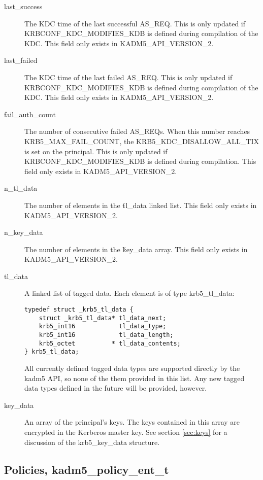 \begin{description}
\item[last_success] The KDC time of the last successful AS_REQ.  This
is only updated if KRBCONF_KDC_MODIFIES_KDB is defined during
compilation of the KDC.  This field only exists in
KADM5_API_VERSION_2.

\item[last_failed] The KDC time of the last failed AS_REQ.  This is
only updated if KRBCONF_KDC_MODIFIES_KDB is defined during compilation
of the KDC.  This field only exists in KADM5_API_VERSION_2.

\item[fail_auth_count] The number of consecutive failed AS_REQs.  When
this number reaches KRB5_MAX_FAIL_COUNT, the KRB5_KDC_DISALLOW_ALL_TIX
is set on the principal.  This is only updated if
KRBCONF_KDC_MODIFIES_KDB is defined during compilation.  This field
only exists in KADM5_API_VERSION_2.

\item[n_tl_data] The number of elements in the \v{tl_data} linked
list.  This field only exists in KADM5_API_VERSION_2.

\item[n_key_data] The number of elements in the \v{key_data}
array. This field only exists in KADM5_API_VERSION_2.

\item[tl_data] A linked list of tagged data.  Each element is of type
krb5_tl_data:
\begin{verbatim}
typedef struct _krb5_tl_data {
    struct _krb5_tl_data* tl_data_next;
    krb5_int16            tl_data_type;         
    krb5_int16            tl_data_length;       
    krb5_octet          * tl_data_contents;     
} krb5_tl_data;
\end{verbatim}
All currently defined tagged data types are supported directly by the
kadm5 API, so none of the them provided in this list.  Any new tagged
data types defined in the future will be provided, however.

\item[key_data] An array of the principal's keys.  The keys contained
in this array are encrypted in the Kerberos master key.  See section
\ref{sec:keys} for a discussion of the krb5_key_data structure.
\end{description}

\subsection{Policies, kadm5_policy_ent_t}
\label{sec:policy-fields}

